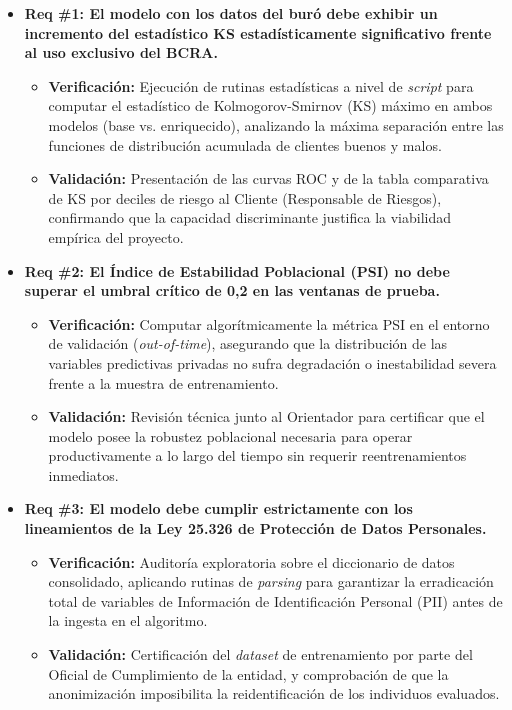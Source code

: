 \documentclass[
11pt, %
]{charter}
\begin{document}
\begin{itemize}

    \item \textbf{Req \#1: El modelo con los datos del buró debe exhibir un incremento del estadístico KS estadísticamente significativo frente al uso exclusivo del BCRA.}
    \begin{itemize}
        \item \textbf{Verificación:} Ejecución de rutinas estadísticas a nivel de \textit{script} para computar el estadístico de Kolmogorov-Smirnov (KS) máximo en ambos modelos (base vs. enriquecido), analizando la máxima separación entre las funciones de distribución acumulada de clientes buenos y malos.
        \item \textbf{Validación:} Presentación de las curvas ROC y de la tabla comparativa de KS por deciles de riesgo al Cliente (Responsable de Riesgos), confirmando que la capacidad discriminante justifica la viabilidad empírica del proyecto.
    \end{itemize}

    \item \textbf{Req \#2: El Índice de Estabilidad Poblacional (PSI) no debe superar el umbral crítico de 0,2 en las ventanas de prueba.}
    \begin{itemize}
        \item \textbf{Verificación:} Computar algorítmicamente la métrica PSI en el entorno de validación (\textit{out-of-time}), asegurando que la distribución de las variables predictivas privadas no sufra degradación o inestabilidad severa frente a la muestra de entrenamiento.
        \item \textbf{Validación:} Revisión técnica junto al Orientador para certificar que el modelo posee la robustez poblacional necesaria para operar productivamente a lo largo del tiempo sin requerir reentrenamientos inmediatos.
    \end{itemize}

    \item \textbf{Req \#3: El modelo debe cumplir estrictamente con los lineamientos de la Ley 25.326 de Protección de Datos Personales.}
    \begin{itemize}
        \item \textbf{Verificación:} Auditoría exploratoria sobre el diccionario de datos consolidado, aplicando rutinas de \textit{parsing} para garantizar la erradicación total de variables de Información de Identificación Personal (PII) antes de la ingesta en el algoritmo.
        \item \textbf{Validación:} Certificación del \textit{dataset} de entrenamiento por parte del Oficial de Cumplimiento de la entidad, y comprobación de que la anonimización imposibilita la reidentificación de los individuos evaluados.
    \end{itemize}


\end{itemize}
\end{document}
